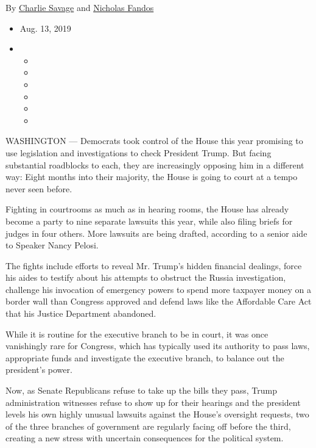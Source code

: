 By \href{https://www.nytimes.com/by/charlie-savage}{Charlie Savage} and
\href{https://www.nytimes.com/by/nicholas-fandos}{Nicholas Fandos}

\begin{itemize}
\item
  Aug. 13, 2019
\item
  \begin{itemize}
  \item
  \item
  \item
  \item
  \item
  \item
  \end{itemize}
\end{itemize}

WASHINGTON --- Democrats took control of the House this year promising
to use legislation and investigations to check President Trump. But
facing substantial roadblocks to each, they are increasingly opposing
him in a different way: Eight months into their majority, the House is
going to court at a tempo never seen before.

Fighting in courtrooms as much as in hearing rooms, the House has
already become a party to nine separate lawsuits this year, while also
filing briefs for judges in four others. More lawsuits are being
drafted, according to a senior aide to Speaker Nancy Pelosi.

The fights include efforts to reveal Mr. Trump's hidden financial
dealings, force his aides to testify about his attempts to obstruct the
Russia investigation, challenge his invocation of emergency powers to
spend more taxpayer money on a border wall than Congress approved and
defend laws like the Affordable Care Act that his Justice Department
abandoned.

While it is routine for the executive branch to be in court, it was once
vanishingly rare for Congress, which has typically used its authority to
pass laws, appropriate funds and investigate the executive branch, to
balance out the president's power.

Now, as Senate Republicans refuse to take up the bills they pass, Trump
administration witnesses refuse to show up for their hearings and the
president levels his own highly unusual lawsuits against the House's
oversight requests, two of the three branches of government are
regularly facing off before the third, creating a new stress with
uncertain consequences for the political system.

